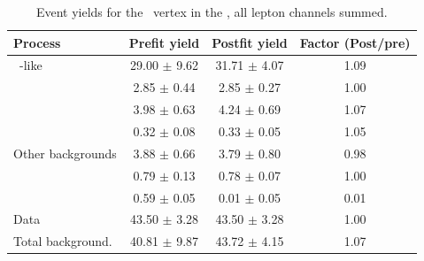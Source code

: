 \begin{table}[htbp]
	\centering
		\caption{Event yields for the \Zct\ vertex in the \TTCR,  all lepton channels summed. }
	
	\begin{tabular} {l c c c }
		\toprule
		Process & Prefit yield & Postfit yield & Factor (Post/pre) \\
		\midrule
		\NPL\ \ttbar-like & 29.00 $ \pm $ 9.62 & 31.71 $ \pm $ 4.07 & 1.09 \\ 
		\ttZ & 2.85 $ \pm $ 0.44 & 2.85 $ \pm $ 0.27 & 1.00 \\ 
		\WZ & 3.98 $ \pm $ 0.63 & 4.24 $ \pm $ 0.69 & 1.07 \\ 
		\ZZ & 0.32 $ \pm $ 0.08 & 0.33 $ \pm $ 0.05 & 1.05 \\ 
		Other backgrounds & 3.88 $ \pm $ 0.66 & 3.79 $ \pm $ 0.80 & 0.98 \\ 
		\tZq & 0.79 $ \pm $ 0.13 & 0.78 $ \pm $ 0.07 & 1.00 \\ 
		\kZct  & 0.59 $ \pm $ 0.05 & 0.01 $ \pm $ 0.05 & 0.01 \B\\
		\hdashline
		Data & 43.50 $ \pm $ 3.28 & 43.50 $ \pm $ 3.28 & 1.00 \T\\
		Total background. & 40.81 $ \pm $ 9.87 & 43.72 $ \pm $ 4.15 & 1.07\\
		\bottomrule
	\end{tabular}
\end{table}

